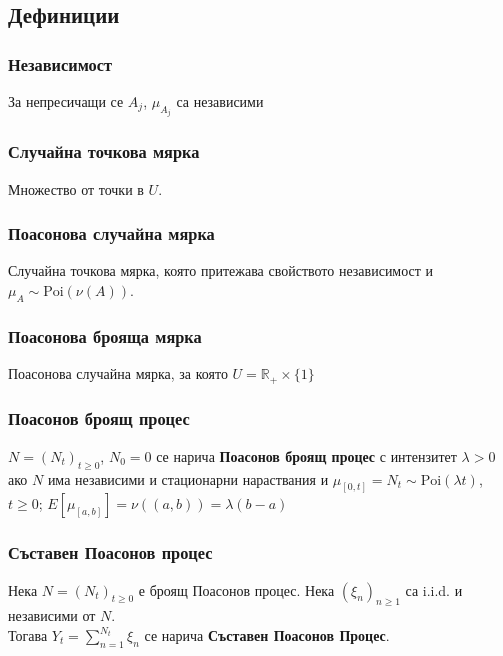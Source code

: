 \documentclass{article}
\begin{document}
\subsection{Дефиниции}
\subsubsection*{Независимост}
За непресичащи се $A_j$, $\mu_{A_j}$ са независими

\subsubsection*{Случайна точкова мярка}
Множество от точки в $U$.

\subsubsection*{Поасонова случайна мярка}
Случайна точкова мярка, която притежава свойството независимост и $\mu_A \sim \text{Poi}(\nu(A))$.

\subsubsection*{Поасонова брояща мярка}
Поасонова случайна мярка, за която $U = \mathbb{R}_+ \times \{1\}$

\subsubsection*{Поасонов броящ процес}
$N=(N_t)_{t\geq0}$, $N_0=0$ се нарича \textbf{Поасонов броящ процес} с интензитет $\lambda>0$ \\
ако $N$ има независими и стационарни нараствания и $\mu_{[0,t]}=N_t\sim\text{Poi}(\lambda t)$, $t\geq0$; $E[\mu_{[a,b]}]=\nu((a,b))=\lambda(b-a)$

\subsubsection*{Съставен Поасонов процес}
Нека $N=(N_t)_{t\geq0}$ е броящ Поасонов процес. Нека $(\xi_n)_{n\geq1}$ са i.i.d. и независими от $N$. \\
Тогава $Y_t=\sum_{n=1}^{N_t} \xi_n$ се нарича \textbf{Съставен Поасонов Процес}.
\end{document}
